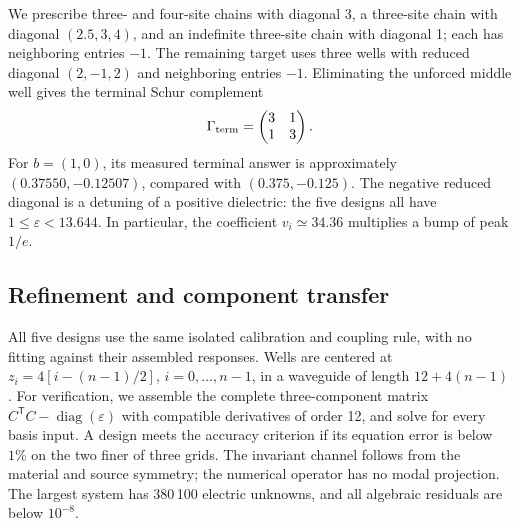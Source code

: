 We prescribe three- and four-site chains with diagonal 3, a three-site chain
with diagonal $(2.5,3,4)$, and an indefinite three-site chain with diagonal 1;
each has neighboring entries $-1$. The remaining target uses three wells with
reduced diagonal $(2,-1,2)$ and neighboring entries $-1$. Eliminating the
unforced middle well gives the terminal Schur complement
\begin{equation}
 \Gamma_{\rm term}=\begin{pmatrix}3&1\\1&3\end{pmatrix}.
 \label{n:eq:mediator}
\end{equation}
For $b=(1,0)$, its measured terminal answer is approximately
$(0.37550,-0.12507)$, compared with $(0.375,-0.125)$. The negative reduced
diagonal is a detuning of a positive dielectric: the five designs all have
$1\le\varepsilon<13.644$. In particular, the coefficient $v_i\simeq34.36$
multiplies a bump of peak $1/e$.

\subsection{Refinement and component transfer}

All five designs use the same isolated calibration and coupling rule, with
no fitting against their assembled responses. Wells are centered at
$z_i=4[i-(n-1)/2]$, $i=0,\ldots,n-1$, in a waveguide of length $12+4(n-1)$.
For verification, we assemble the complete three-component matrix
$C^{\mathsf T}C-\operatorname{diag}(\varepsilon)$ with compatible derivatives
of order 12, and solve for every basis input. A design meets the accuracy
criterion if its equation error is below $1\%$ on the two finer of three
grids. The invariant channel follows from
the material and source symmetry; the numerical operator has no modal
projection. The largest system has 380\,100 electric unknowns, and all
algebraic residuals are below $10^{-8}$.

\begin{table}[tbp]
\centering
\caption{\textbf{Fixed-design waveguide refinement.} Entries are the percentage
equation error $100\norm{\Gamma X-I}_2$. Each row holds its material,
continuous source functions and decoder fixed across the three full-vector
grids. The final column uses the same design and source in the independent
one-dimensional channel calculation at longitudinal spacing $0.005$.
The coarsest indefinite-chain error exceeds the $1\%$ criterion; all five
targets meet it on both finer full-vector grids.}
\label{n:tab:waveguide-errors}
\small
\setlength{\tabcolsep}{4pt}

\end{table}

